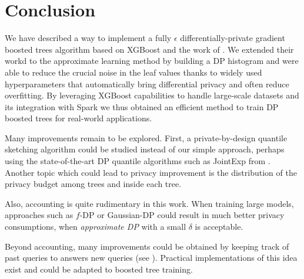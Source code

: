 \documentclass{article}
\theoremstyle{definition}
\begin{document}
\section{Conclusion} 

We have described a way to implement a fully $\epsilon$ differentially-private gradient boosted trees algorithm based on XGBoost and the work of \cite{li2020privacy}.
We extended their workd to the approximate learning method by building a DP histogram and were able to reduce the crucial noise in the leaf values thanks to widely used hyperparameters that automatically bring differential privacy and often reduce overfitting. By leveraging XGBoost capabilities to handle large-scale datasets and its integration with Spark we thus obtained an efficient method to train DP boosted trees for real-world applications. 

Many improvements remain to be explored. First, a private-by-design quantile sketching algorithm could be studied instead of our simple approach,
perhaps using the state-of-the-art DP quantile algorithms such as JointExp from \cite{gillenwater2021}.
Another topic which could lead to privacy improvement is the distribution of the privacy budget among trees and inside each tree. 

Also, accounting is quite rudimentary in this work. When training large models, approaches such as $f$-DP or Gaussian-DP \cite{dong2019gaussian} could result in
much better privacy consumptions, when \emph{approximate DP} with a small $\delta$ is acceptable.

Beyond accounting, many improvements could be obtained by keeping track of past queries to answers new queries (see \cite{dwork2012privacy}).
Practical implementations of this idea exist \cite{kotsogiannis2019privatesql, kotsogiannis2019architecting} and could be adapted to boosted tree training.
 


\end{document}
